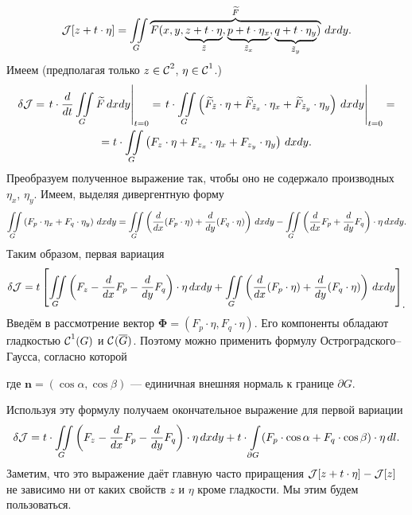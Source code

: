 \begin{equation*}
	\hfill\J[z+t\cdot\eta]=\iint\limits_{G}\overbrace{F(x,y,\underbrace{z+t\cdot\eta}_{\tilde{z}},\underbrace{p+t\cdot\eta_x}_{\tilde{z}_x},\underbrace{q+t\cdot\eta_y}_{\tilde{z}_y})}^{\widetilde{F}}\,dxdy.\hfill
\end{equation*}
Имеем (предполагая только $z\in\mathcal{C}{\mathstrut}^{2}_{}$, $\eta\in\mathcal{C}{\mathstrut}^{1}_{}$.)
\begin{multline*}
	\delta\mathcal{J}=\left.t\cdot\frac{d}{dt}\iint\limits_{G}\widetilde{F}\,dxdy\right|_{t=0}=\left.t\cdot\iint\limits_{G}\left(\widetilde{F}_{\tilde{z}}\cdot\eta+\widetilde{F}_{\tilde{z}_x}\cdot\eta_x+\widetilde{F}_{\tilde{z}_y}\cdot\eta_y\right)\,dxdy\right|_{t=0}=\\=t\cdot\iint\limits_{G}\left({F}_{z}\cdot\eta+{F}_{z_x}\cdot\eta_x+{F}_{z_y}\cdot\eta_y\right)\,dxdy.
\end{multline*}
Преобразуем полученное выражение так, чтобы оно не содержало производных $\eta_x$, $\eta_y$. Имеем, выделяя дивергентную форму 
\begin{equation*}
	\iint\limits_{G}\left(F_p\cdot\eta_x+F_q\cdot\eta_y\right)\,dxdy=\iint\limits_{G}\left(\frac{d}{dx}(F_p\cdot\eta)+\frac{d}{dy}(F_q\cdot\eta)\right)\,dxdy-\iint\limits_{G}\left(\frac{d}{dx}F_p+\frac{d}{dy}F_q\right)\cdot\eta\,dxdy.
\end{equation*}
Таким образом, первая вариация
\begin{equation*}
	\hfill\delta\J=t\left[\iint\limits_{G}\left(F_z-\der{}{x}F_p-\der{}{y}F_q\right)\cdot\eta\,dxdy+\iint\limits_{G}\left(\der{}{x}(F_p\cdot\eta)+\der{}{y}(F_q\cdot\eta)\right)\,dxdy\right]_{\displaystyle.}\hfill
\end{equation*}
Введём в рассмотрение вектор $\bm{\Phi}=(F_p\cdot\eta,F_q\cdot\eta)$. Его компоненты обладают гладкостью $\mathcal{C}{\mathstrut}^{1}_{}(G)$ и $\mathcal{C}{\mathstrut}^{}_{}(\overline{G})$. Поэтому можно применить формулу Остроградского--Гаусса, согласно которой
\begin{center}
\end{center}
где $\bm{n}=(\cos\alpha,\cos\beta)$ --- единичная внешняя нормаль к границе $\partial G$.

\noindent Используя эту формулу получаем окончательное выражение для первой вариации
\begin{equation}\label{l9:eq:10}
	\hfill\delta\J=t\cdot\iint\limits_{G}\left(F_z-\der{}{x}F_p-\der{}{y}F_q\right)\cdot\eta\,dxdy+t\cdot\int\limits_{\partial G}(F_p\cdot\cos\alpha+F_q\cdot\cos\beta)\cdot\eta\,dl.\hfill
\end{equation}
Заметим, что это выражение даёт главную часто приращения $\mathcal{J}[z+t\cdot\eta]-\mathcal{J}[z]$ не зависимо ни от каких свойств $z$ и $\eta$ кроме гладкости. Мы этим будем пользоваться.


